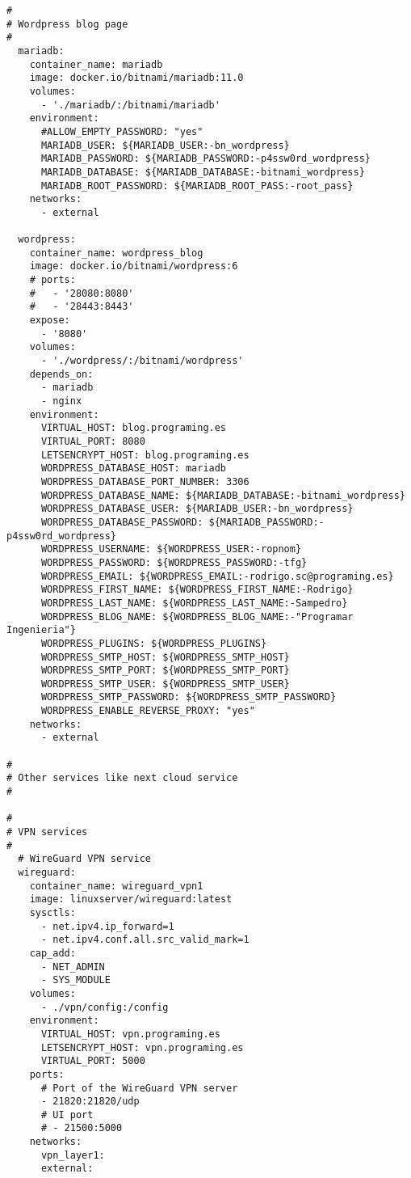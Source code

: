 \begin{lstlisting}[style=yaml, caption={docker-compose.yml MVP prueba de concepto.}, label={lst:mvp_mock} ]
#
# Wordpress blog page
#
  mariadb:
    container_name: mariadb
    image: docker.io/bitnami/mariadb:11.0
    volumes:
      - './mariadb/:/bitnami/mariadb'
    environment:
      #ALLOW_EMPTY_PASSWORD: "yes"
      MARIADB_USER: ${MARIADB_USER:-bn_wordpress}
      MARIADB_PASSWORD: ${MARIADB_PASSWORD:-p4ssw0rd_wordpress}
      MARIADB_DATABASE: ${MARIADB_DATABASE:-bitnami_wordpress}
      MARIADB_ROOT_PASSWORD: ${MARIADB_ROOT_PASS:-root_pass}
    networks:
      - external
      
  wordpress:
    container_name: wordpress_blog
    image: docker.io/bitnami/wordpress:6
    # ports:
    #   - '28080:8080'
    #   - '28443:8443'
    expose:
      - '8080'
    volumes:
      - './wordpress/:/bitnami/wordpress'
    depends_on:
      - mariadb
      - nginx
    environment:
      VIRTUAL_HOST: blog.programing.es
      VIRTUAL_PORT: 8080
      LETSENCRYPT_HOST: blog.programing.es
      WORDPRESS_DATABASE_HOST: mariadb
      WORDPRESS_DATABASE_PORT_NUMBER: 3306
      WORDPRESS_DATABASE_NAME: ${MARIADB_DATABASE:-bitnami_wordpress}
      WORDPRESS_DATABASE_USER: ${MARIADB_USER:-bn_wordpress}
      WORDPRESS_DATABASE_PASSWORD: ${MARIADB_PASSWORD:-p4ssw0rd_wordpress}
      WORDPRESS_USERNAME: ${WORDPRESS_USER:-ropnom}
      WORDPRESS_PASSWORD: ${WORDPRESS_PASSWORD:-tfg}
      WORDPRESS_EMAIL: ${WORDPRESS_EMAIL:-rodrigo.sc@programing.es}
      WORDPRESS_FIRST_NAME: ${WORDPRESS_FIRST_NAME:-Rodrigo}
      WORDPRESS_LAST_NAME: ${WORDPRESS_LAST_NAME:-Sampedro}
      WORDPRESS_BLOG_NAME: ${WORDPRESS_BLOG_NAME:-"Programar Ingenieria"}
      WORDPRESS_PLUGINS: ${WORDPRESS_PLUGINS}
      WORDPRESS_SMTP_HOST: ${WORDPRESS_SMTP_HOST}
      WORDPRESS_SMTP_PORT: ${WORDPRESS_SMTP_PORT}
      WORDPRESS_SMTP_USER: ${WORDPRESS_SMTP_USER}
      WORDPRESS_SMTP_PASSWORD: ${WORDPRESS_SMTP_PASSWORD}
      WORDPRESS_ENABLE_REVERSE_PROXY: "yes"
    networks:
      - external

#
# Other services like next cloud service
#

#
# VPN services
#
  # WireGuard VPN service
  wireguard:
    container_name: wireguard_vpn1
    image: linuxserver/wireguard:latest
    sysctls:
      - net.ipv4.ip_forward=1
      - net.ipv4.conf.all.src_valid_mark=1
    cap_add:
      - NET_ADMIN
      - SYS_MODULE
    volumes:
      - ./vpn/config:/config
    environment:
      VIRTUAL_HOST: vpn.programing.es
      LETSENCRYPT_HOST: vpn.programing.es
      VIRTUAL_PORT: 5000
    ports:
      # Port of the WireGuard VPN server
      - 21820:21820/udp
      # UI port
      # - 21500:5000
    networks:
      vpn_layer1:
      external:


\end{lstlisting}
